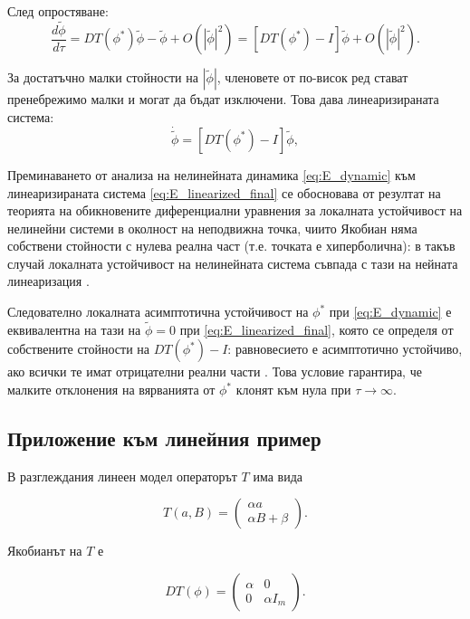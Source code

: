 След опростяване:
\begin{equation}
\frac{d\tilde{\phi}}{d\tau} = DT(\phi^*)\tilde{\phi} - \tilde{\phi} + O(|\tilde{\phi}|^2) = [DT(\phi^*) - I]\tilde{\phi} + O(|\tilde{\phi}|^2).
\label{eq:almost_linear}
\end{equation}

За достатъчно малки стойности на $|\tilde{\phi}|$, членовете от по-висок ред стават пренебрежимо малки и могат да бъдат изключени. Това дава линеаризираната система:
\begin{equation}
\dot{\tilde{\phi}} = [DT(\phi^\ast)-I]\tilde{\phi},
\label{eq:E_linearized_final}
\end{equation}

Преминаването от анализа на нелинейната динамика \eqref{eq:E_dynamic} 
към линеаризираната система \eqref{eq:E_linearized_final} се обосновава 
от резултат на теорията на обикновените диференциални уравнения за 
локалната устойчивост на нелинейни системи в околност на неподвижна точка, 
чиито Якобиан няма собствени стойности с нулева реална част (т.е. точката 
е хиперболична): в такъв случай локалната устойчивост на нелинейната 
система съвпада с тази на нейната линеаризация \parencite[Proposition 5.6, 
с. 96]{GeorgeEvans_2001}.

Следователно локалната асимптотична устойчивост на $\phi^\ast$ при 
\eqref{eq:E_dynamic} е еквивалентна на тази на $\tilde{\phi}=0$ при 
\eqref{eq:E_linearized_final}, която се определя от собствените стойности 
на $DT(\phi^\ast)-I$: равновесието е асимптотично устойчиво, ако всички 
те имат отрицателни реални части 
\parencite[Proposition 5.6, с. 96]{GeorgeEvans_2001}. Това условие 
гарантира, че малките отклонения на вярванията от $\phi^\ast$ клонят 
към нула при $\tau \to \infty$.

\subsection*{Приложение към линейния пример}

В разглеждания линеен модел операторът $T$ има вида

\[
T(a,B)=
\begin{pmatrix}
\alpha a \\
\alpha B + \beta
\end{pmatrix}.
\]

Якобианът на $T$ е

\[
DT(\phi)=
\begin{pmatrix}
\alpha & 0 \\
0 & \alpha I_m
\end{pmatrix}.
\]

